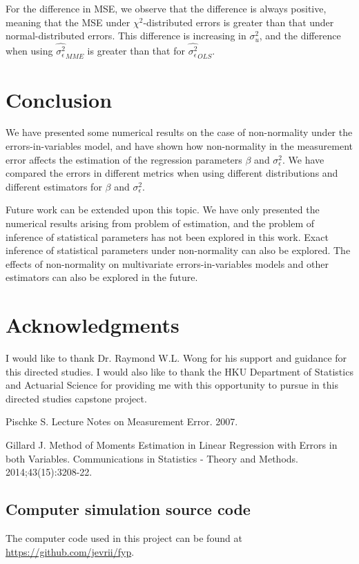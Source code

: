 \documentclass{article}
\begin{document}
For the difference in MSE, we observe that the difference is always positive, meaning that the MSE under $\chi^2$-distributed errors is greater than that under normal-distributed errors.
This difference is increasing in $\sigma^2_u$, and the difference when using $\hat{\sigma^2_\epsilon}_{MME}$ is greater than that for $\hat{\sigma^2_\epsilon}_{OLS}$.

\section{Conclusion}

We have presented some numerical results on the case of non-normality under the errors-in-variables model,
and have shown how non-normality in the measurement error affects the estimation of the regression parameters $\beta$ and $\sigma^2_\epsilon$. 
We have compared the errors in different metrics when using different distributions and different estimators for $\beta$ and $\sigma^2_\epsilon$.

Future work can be extended upon this topic.
We have only presented the numerical results arising from problem of estimation,
and the problem of inference of statistical parameters has not been explored in this work.
Exact inference of statistical parameters under non-normality can also be explored.
The effects of non-normality on multivariate errors-in-variables models and other estimators can also be explored in the future.

\section{Acknowledgments}

I would like to thank Dr. Raymond W.L. Wong for his support and guidance for this directed studies.
I would also like to thank the HKU Department of Statistics and Actuarial Science for providing me with this opportunity to pursue in this directed studies capstone project.

\begin{thebibliography}{9}

    Pischke S. Lecture Notes on Measurement Error. 2007.

    Gillard J. Method of Moments Estimation in Linear Regression with Errors in both Variables. Communications in Statistics - Theory and Methods. 2014;43(15):3208-22.
\end{thebibliography}

\begin{appendices}

\section{Computer simulation source code}

The computer code used in this project can be found at \url{https://github.com/jevrii/fyp}.



\end{appendices}
\end{document}
